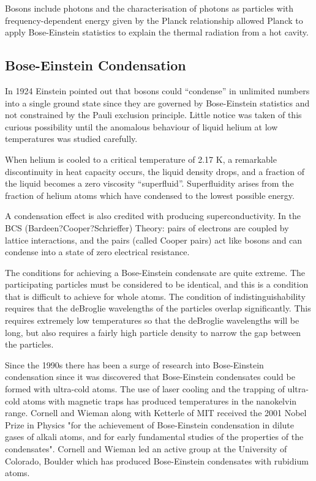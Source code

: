 \documentclass{article}
\begin{document}
Bosons include photons and the characterisation of photons as particles with frequency-dependent energy given by the Planck relationship allowed Planck to apply Bose-Einstein statistics to explain the thermal radiation from a hot cavity.

\subsection{Bose-Einstein Condensation}
In 1924 Einstein pointed out that bosons could ``condense'' in unlimited numbers into a single ground state since they are governed by Bose-Einstein statistics and not constrained by the Pauli exclusion principle. Little notice was taken of this curious possibility until the anomalous behaviour of liquid helium at low temperatures was studied carefully.

When helium is cooled to a critical temperature of 2.17 K, a remarkable discontinuity in heat capacity occurs, the liquid density drops, and a fraction of the liquid becomes a zero viscosity ``superfluid''. Superfluidity arises from the fraction of helium atoms which have condensed to the lowest possible energy.

A condensation effect is also credited with producing superconductivity. In the BCS (Bardeen?Cooper?Schrieffer) Theory: pairs of electrons are coupled by lattice interactions, and the pairs (called Cooper pairs) act like bosons and can condense into a state of zero electrical resistance.

The conditions for achieving a Bose-Einstein condensate are quite extreme. The participating particles must be considered to be identical, and this is a condition that is difficult to achieve for whole atoms. The condition of indistinguishability requires that the deBroglie wavelengths of the particles overlap significantly. This requires extremely low temperatures so that the deBroglie wavelengths will be long, but also requires a fairly high particle density to narrow the gap between the particles.

Since the 1990s there has been a surge of research into Bose-Einstein condensation since it was discovered that Bose-Einstein condensates could be formed with ultra-cold atoms. The use of laser cooling and the trapping of ultra-cold atoms with magnetic traps has produced temperatures in the nanokelvin range. Cornell and Wieman along with Ketterle of MIT received the 2001 Nobel Prize in Physics "for the achievement of Bose-Einstein condensation in dilute gases of alkali atoms, and for early fundamental studies of the properties of the condensates". Cornell and Wieman led an active group at the University of Colorado, Boulder which has produced Bose-Einstein condensates with rubidium atoms.
\end{document}
